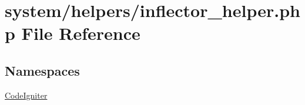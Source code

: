 \hypertarget{inflector__helper_8php}{\section{system/helpers/inflector\-\_\-helper.php File Reference}
\label{inflector__helper_8php}
}
\subsection*{Namespaces}
\begin{DoxyCompactItemize}
\item 
\hyperlink{namespace_code_igniter}{Code\-Igniter}
\end{DoxyCompactItemize}
